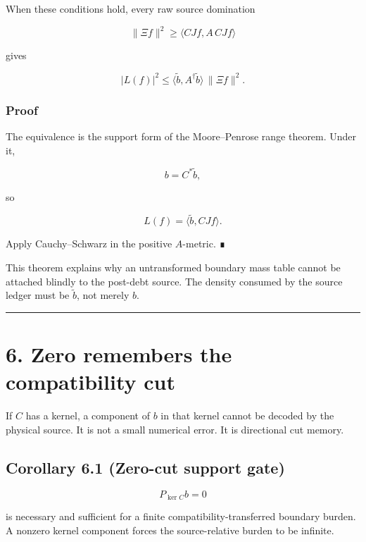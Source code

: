 When these conditions hold, every raw source domination

\[
\|\Xi f\|^2
\ge
\langle CJf,A\,CJf\rangle
\]

gives

\[
\boxed{
|L(f)|^2
\le
\langle\widetilde b,A^\dagger\widetilde b\rangle
\,\|\Xi f\|^2.
}
\tag{5.1}
\]

\hypertarget{proof-1}{%
\subsubsection{Proof}\label{proof-1}}

The equivalence is the support form of the Moore--Penrose range theorem. Under
it,

\[
b=C^*\widetilde b,
\]

so

\[
L(f)=\langle\widetilde b,CJf\rangle.
\]

Apply Cauchy--Schwarz in the positive \(A\)-metric. ∎

This theorem explains why an untransformed boundary mass table cannot be
attached blindly to the post-debt source. The density consumed by the source
ledger must be \(\widetilde b\), not merely \(b\).

\begin{center}\rule{0.5\linewidth}{0.5pt}\end{center}

\hypertarget{zero-remembers-the-compatibility-cut}{%
\section{6. Zero remembers the compatibility cut}\label{zero-remembers-the-compatibility-cut}}

If \(C\) has a kernel, a component of \(b\) in that kernel cannot be decoded by
the physical source. It is not a small numerical error. It is directional
cut memory.

\hypertarget{corollary-6.1-zero-cut-support-gate}{%
\subsection{Corollary 6.1 (Zero-cut support gate)}\label{corollary-6.1-zero-cut-support-gate}}

\[
\boxed{
P_{\ker C}b=0
}
\tag{6.1}
\]

is necessary and sufficient for a finite compatibility-transferred boundary
burden. A nonzero kernel component forces the source-relative burden to be
infinite.

